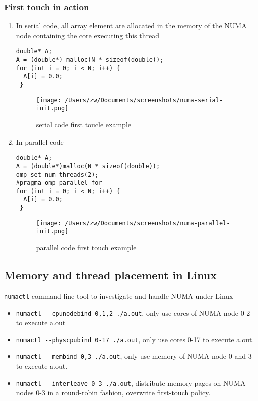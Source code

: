\documentclass[11pt]{article}
\begin{document}
\subsubsection{First touch in action}
\label{sec-1-4-1}
\begin{enumerate}
\item In serial code, all array element are allocated in the memory of the NUMA node containing the core executing this thread
\label{sec-1-4-1-1}
\begin{verbatim}
double* A;
A = (double*) malloc(N * sizeof(double));
for (int i = 0; i < N; i++) {
  A[i] = 0.0;
 }
\end{verbatim}

\begin{figure}[htb]
\centering
\texttt{[image: /Users/zw/Documents/screenshots/numa-serial-init.png]}
\caption{\label{fig:numa-serial-init}serial code first toucle example}
\end{figure}

\item In parallel code
\label{sec-1-4-1-2}
\begin{verbatim}
double* A;
A = (double*)malloc(N * sizeof(double));
omp_set_num_threads(2);
#pragma omp parallel for
for (int i = 0; i < N; i++) {
  A[i] = 0.0;
 }
\end{verbatim}

\begin{figure}[htb]
\centering
\texttt{[image: /Users/zw/Documents/screenshots/numa-parallel-init.png]}
\caption{\label{fig:numa-parallel-init}parallel code first touch example}
\end{figure}
\end{enumerate}

\subsection{Memory and thread placement in Linux}
\label{sec-1-5}
\verb~numactl~ command line tool to investigate and handle NUMA under Linux
\begin{itemize}
\item \verb~numactl --cpunodebind 0,1,2 ./a.out~, only use cores of NUMA node 0-2 to execute a.out
\item \verb~numactl --physcpubind 0-17 ./a.out~, only use cores 0-17 to execute a.out.
\item \verb~numactl --membind 0,3 ./a.out~, only use memory of NUMA node 0 and 3 to execute a.out.
\item \verb~numactl --interleave 0-3 ./a.out~, distribute memory pages on NUMA nodes 0-3 in a round-robin fashion, overwrite first-touch policy.
\end{itemize}
\end{document}
